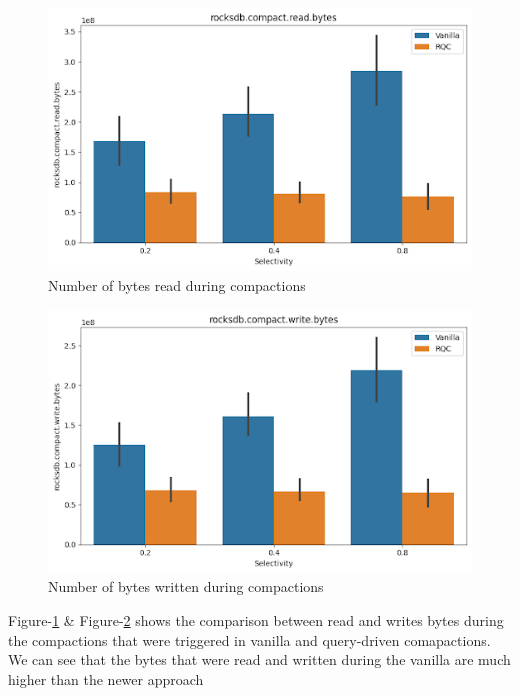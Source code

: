 \begin{figure}
    \includegraphics[scale=0.45]{Figures/Compaction Read Bytes.png}
    \caption{Number of bytes read during compactions}\label{fig:compaction_read_bytes}
\end{figure}

\begin{figure}
    \includegraphics[scale=0.45]{Figures/Compaction Write Bytes.png}
    \caption{Number of bytes written during compactions}\label{fig:compaction_write_bytes}
\end{figure}

Figure-\ref{fig:compaction_read_bytes} \& Figure-\ref{fig:compaction_write_bytes} shows the comparison between read and 
writes bytes during the compactions that were triggered in vanilla and query-driven comapactions. We can see that the 
bytes that were read and written during the vanilla are much higher than the newer approach

